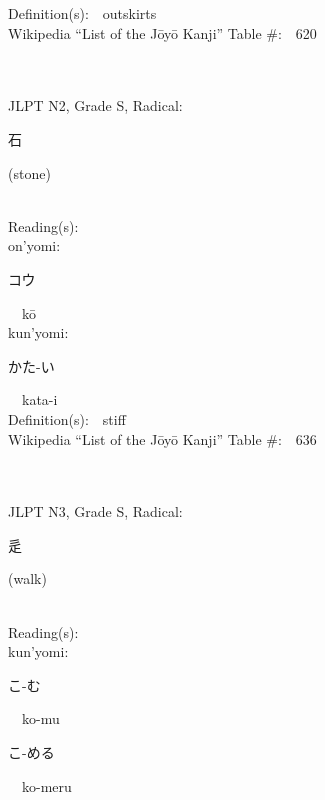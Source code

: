 \begin{multicols}{2}
Definition(s):\ \ outskirts \\
Wikipedia ``List of the J\=oy\=o Kanji'' Table \#:\ \ 620 \\
\ \ \\
{\fontsize{34pt}{40pt}  }\ \ \\  %
{JLPT N2, Grade S, Radical:\ \ {\begin{CJK}{UTF8}{min} 石 \end{CJK}} (stone) } \\
Reading(s):\ \ \\
{\hspace*{1em}}on'yomi:\ \ \\
{\hspace*{2em}}{\begin{CJK}{UTF8}{min} コウ \end{CJK}}\ \ k\=o\ \ \\
{\hspace*{1em}}kun'yomi:\ \ \\
{\hspace*{2em}}{\begin{CJK}{UTF8}{min} かた-い \end{CJK}}\ \ kata-i\ \ \\
Definition(s):\ \ stiff \\
Wikipedia ``List of the J\=oy\=o Kanji'' Table \#:\ \ 636 \\
\ \ \\
{\fontsize{34pt}{40pt}  }\ \ \\  %
{JLPT N3, Grade S, Radical:\ \ {\begin{CJK}{UTF8}{min} 辵 \end{CJK}} (walk) } \\
Reading(s):\ \ \\
{\hspace*{1em}}kun'yomi:\ \ \\
{\hspace*{2em}}{\begin{CJK}{UTF8}{min} こ-む \end{CJK}}\ \ ko-mu\ \ \\
{\hspace*{2em}}{\begin{CJK}{UTF8}{min} こ-める \end{CJK}}\ \ ko-meru\ \ \\

\end{multicols}
